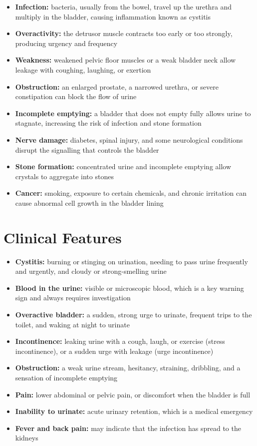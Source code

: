 \begin{itemize}
    \item \textbf{Infection:} bacteria, usually from the bowel, travel up the urethra and multiply in the bladder, causing inflammation known as cystitis
    \item \textbf{Overactivity:} the detrusor muscle contracts too early or too strongly, producing urgency and frequency
    \item \textbf{Weakness:} weakened pelvic floor muscles or a weak bladder neck allow leakage with coughing, laughing, or exertion
    \item \textbf{Obstruction:} an enlarged prostate, a narrowed urethra, or severe constipation can block the flow of urine
    \item \textbf{Incomplete emptying:} a bladder that does not empty fully allows urine to stagnate, increasing the risk of infection and stone formation
    \item \textbf{Nerve damage:} diabetes, spinal injury, and some neurological conditions disrupt the signalling that controls the bladder
    \item \textbf{Stone formation:} concentrated urine and incomplete emptying allow crystals to aggregate into stones
    \item \textbf{Cancer:} smoking, exposure to certain chemicals, and chronic irritation can cause abnormal cell growth in the bladder lining
\end{itemize}

\section*{Clinical Features}
\begin{itemize}
    \item \textbf{Cystitis:} burning or stinging on urination, needing to pass urine frequently and urgently, and cloudy or strong-smelling urine
    \item \textbf{Blood in the urine:} visible or microscopic blood, which is a key warning sign and always requires investigation
    \item \textbf{Overactive bladder:} a sudden, strong urge to urinate, frequent trips to the toilet, and waking at night to urinate
    \item \textbf{Incontinence:} leaking urine with a cough, laugh, or exercise (stress incontinence), or a sudden urge with leakage (urge incontinence)
    \item \textbf{Obstruction:} a weak urine stream, hesitancy, straining, dribbling, and a sensation of incomplete emptying
    \item \textbf{Pain:} lower abdominal or pelvic pain, or discomfort when the bladder is full
    \item \textbf{Inability to urinate:} acute urinary retention, which is a medical emergency
    \item \textbf{Fever and back pain:} may indicate that the infection has spread to the kidneys
\end{itemize}

